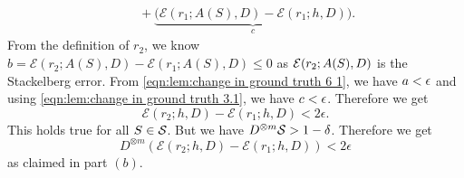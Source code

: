 \begin{apdxproof}
\begin{equation}
\begin{aligned}
    &\quad + \underbrace{\big(\mathcal{E}(r_1; A(S),D) - \mathcal{E}(r_1; h,D)\big)}_c.
\end{aligned}
\end{equation}
From the definition of $r_2$, we know $b = \mathcal{E}(r_2; A(S),D) - \mathcal{E}(r_1; A(S),D) \leq 0$ as $\mathcal{E}(r_2;A(S),D)$ is the Stackelberg error. From \eqref{eqn:lem:change in ground truth 6 1}, we have $a < \epsilon$ and using \eqref{eqn:lem:change in ground truth 3.1}, we have $c < \epsilon$. Therefore we get
\[
\mathcal{E}(r_2; h,D) - \mathcal{E}(r_1; h,D) < 2\epsilon.
\]
This holds true for all $S \in \mathcal{S}$. But we have $D^{\otimes m}\mathcal{S} > 1-\delta$. Therefore we get 
\[D^{\otimes m}(\mathcal{E}(r_2; h,D) - \mathcal{E}(r_1; h,D)) < 2\epsilon
\]
as claimed in part $(b)$.
    
\end{apdxproof}